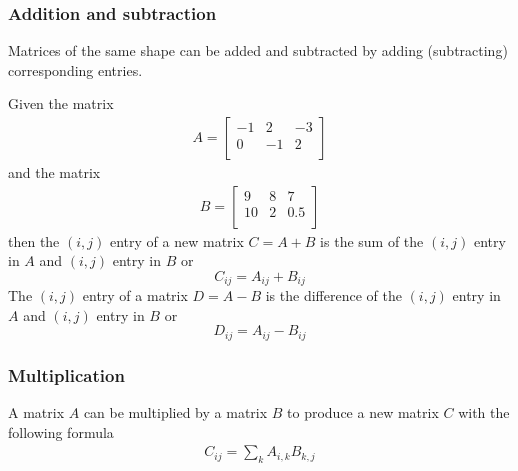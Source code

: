 \subsubsection{Addition and subtraction}
Matrices of the same shape can be added and subtracted by adding (subtracting) corresponding entries. 

Given the matrix
\begin{align}
    A = \begin{bmatrix}
        -1 & 2 & -3 \\ 
         0 & -1 & 2 \\ 
    \end{bmatrix}
\end{align}
and the matrix
\begin{align}
    B = \begin{bmatrix}
        9 & 8 & 7 \\ 
         10 & 2 & 0.5 \\ 
    \end{bmatrix}
\end{align}
then the $(i,j)$ entry of a new matrix $C = A + B$ is the sum of the $(i,j)$ entry in $A$ and $(i,j)$ entry in $B$ or
\begin{equation}
    C_{ij} = A_{ij} + B_{ij}
\end{equation}
The $(i,j)$ entry of a matrix $D = A - B$ is the difference of 
the $(i,j)$ entry in $A$ and $(i,j)$ entry in $B$ or
\begin{equation}
    D_{ij} = A_{ij} - B_{ij}
\end{equation}

\subsubsection{Multiplication}

A matrix $A$ can be multiplied by a matrix $B$ to produce a new matrix $C$ with the following formula
\begin{align}
    C_{ij} = \sum_{k} A_{i,k} B_{k,j}
\end{align}


